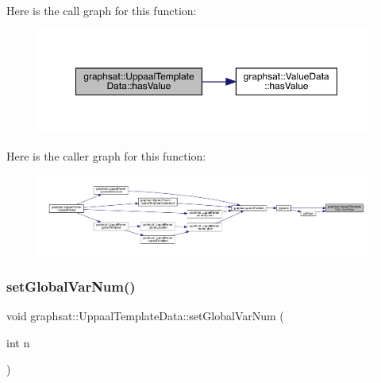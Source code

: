Here is the call graph for this function\+:
\nopagebreak
\begin{figure}[H]
\begin{center}
\leavevmode
\includegraphics[width=350pt]{classgraphsat_1_1_uppaal_template_data_a72b77355129690fecd51e9641923d4e0_cgraph}
\end{center}
\end{figure}
Here is the caller graph for this function\+:
\nopagebreak
\begin{figure}[H]
\begin{center}
\leavevmode
\includegraphics[width=350pt]{classgraphsat_1_1_uppaal_template_data_a72b77355129690fecd51e9641923d4e0_icgraph}
\end{center}
\end{figure}
\mbox{\label{classgraphsat_1_1_uppaal_template_data_af659c4040700ad25b760b279ae962f46}} 
\subsubsection{\texorpdfstring{setGlobalVarNum()}{setGlobalVarNum()}}
{\footnotesize\ttfamily void graphsat\+::\+Uppaal\+Template\+Data\+::set\+Global\+Var\+Num (\begin{DoxyParamCaption}\item[{int}]{n }\end{DoxyParamCaption})\hspace{0.3cm}{\ttfamily [inline]}}

